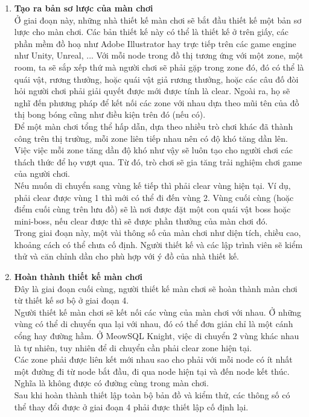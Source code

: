 \begin{enumerate}
	\item \textbf{Tạo ra bản sơ lược của màn chơi}\\
	\hspace*{0.5cm}  Ở giai đoạn này, những nhà thiết kế màn chơi sẽ bắt đầu thiết kế một bản sơ lược cho màn chơi. Các bản thiết kế này có thể là thiết kế ở trên giấy, các phần mềm đồ hoạ như Adobe Illustrator hay
	trực tiếp trên các game engine như Unity, Unreal, ... Với mỗi node trong đồ thị tương ứng với một zone, một room, ta sẽ sắp xếp thứ mà người chơi sẽ phải gặp trong zone đó, đó có thể là quái vật, rương thưởng, hoặc quái vật giả rương thưởng, hoặc các câu đố đòi hỏi người chơi phải giải quyết được mới được tính là clear.  Ngoài ra, họ sẽ nghĩ đến phương pháp để kết nối các zone với nhau dựa theo mũi tên của đồ thị bong bóng cũng như điều kiện trên đó (nếu có).\\
	\hspace*{0.5cm} Để một màn chơi tổng thể hấp dẫn, dựa theo nhiều trò chơi khác đã thành công trên thị trường, mỗi zone liên tiếp nhau nên có độ khó tăng dần lên. Việc việc mỗi zone tăng dần độ khó như vậy sẽ luôn tạo cho người chơi các thách thức để họ vượt qua. Từ đó, trò chơi sẽ gia tăng trải nghiệm chơi game của người chơi.\\
	\hspace*{0.5cm} Nếu muốn di chuyển sang vùng kế tiếp thì phải clear vùng hiện tại. Ví dụ, phải clear được vùng 1 thì mới có thể đi đến vùng 2.  Vùng cuối cùng (hoặc điểm cuối cùng trên lưu đồ) sẽ là nơi được đặt một con quái vật boss hoặc mini-boss, nếu clear được thì sẽ được phần thưởng của màn chơi đó.\\
	\hspace*{0.5cm} Trong giai đoạn này, một vài thông số của màn chơi như diện tích, chiều cao, khoảng cách có thể chưa cố định. Người thiết kế và các lập trình viên sẽ kiểm thử và căn chỉnh dần cho phù hợp với ý đồ của nhà thiết kế.\\
	\item \textbf{Hoàn thành thiết kế màn chơi}\\
	\hspace*{0.5cm} Đây là giai đoạn cuối cùng, người thiết kế màn chơi sẽ hoàn thành màn chơi từ thiết kế sơ bộ ở giai đoạn 4.\\
	\hspace*{0.5cm} Người thiết kế màn chơi sẽ kết nối các vùng của màn chơi với nhau. Ở những vùng có thể di chuyển qua lại với nhau, đó có thể đơn giản chỉ là một cánh cổng hay đường hầm. Ở MeowSQL Knight, việc di chuyển 2 vùng khác nhau là tự nhiên, tuy nhiên để di chuyển cần phải clear zone hiện tại.\\
	\hspace*{0.5cm} Các zone phải được liên kết mới nhau sao cho phải với mỗi node có ít nhất một đường đi từ node bắt đầu, đi qua node hiện tại và đến node kết thúc. Nghĩa là không được có đường cùng trong màn chơi.\\
	\hspace*{0.5cm} Sau khi hoàn thành thiết lập toàn bộ bản đồ và kiểm thử, các thông số có thể thay đổi được ở giai đoạn 4 phải được thiết lập cố định lại.
\end{enumerate}
